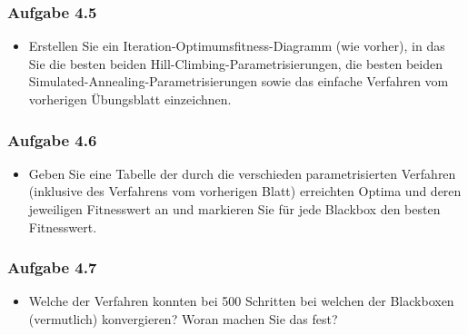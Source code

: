 \documentclass[xcolor=pdftex,dvipsnames,table]{beamer}
\begin{document}
\begin{frame}
  \frametitle{Aufgabe 4.5}
  \begin{itemize}
  		\item Erstellen Sie ein Iteration-Optimumsfitness-Diagramm (wie vorher), in das Sie die besten beiden
Hill-Climbing-Parametrisierungen, die besten beiden Simulated-Annealing-Parametrisierungen sowie
das einfache Verfahren vom vorherigen Übungsblatt einzeichnen.
  \end{itemize}
\end{frame}

\begin{frame}
  \frametitle{Aufgabe 4.6}
  \begin{itemize}
  		\item Geben Sie eine Tabelle der durch die verschieden parametrisierten Verfahren (inklusive des
Verfahrens vom vorherigen Blatt) erreichten Optima und deren jeweiligen Fitnesswert an und
markieren Sie für jede Blackbox den besten Fitnesswert.
  \end{itemize}
\end{frame}

\begin{frame}
  \frametitle{Aufgabe 4.7}
  \begin{itemize}
  		\item Welche der Verfahren konnten bei 500 Schritten bei welchen der Blackboxen (vermutlich) konvergieren?
Woran machen Sie das fest?
  \end{itemize}
\end{frame}
\end{document}
